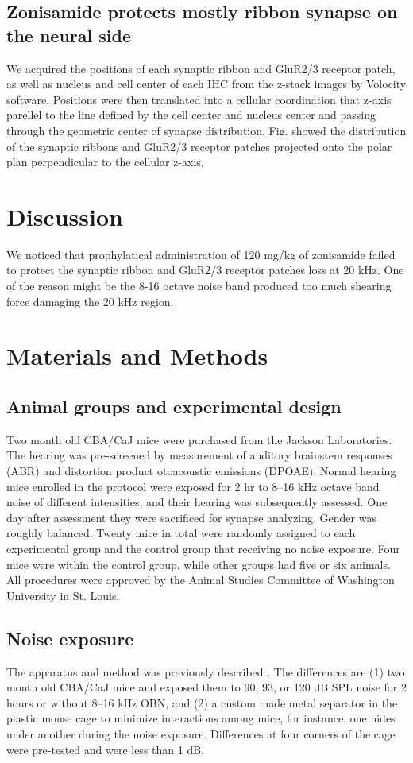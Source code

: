 \documentclass[11pt]{article}
\begin{document}
\subsection {Zonisamide protects mostly ribbon synapse on the neural side}

We acquired the positions of each synaptic ribbon and GluR2/3 receptor patch, as well as nucleus and cell center of each IHC from the z-stack images by Volocity software. Positions were then translated into a cellular coordination that z-axis parellel to the line defined by the cell center and nucleus center and passing through the geometric center of synapse distribution. Fig. showed the distribution of the synaptic ribbons and GluR2/3 receptor patches projected onto the polar plan perpendicular to the cellular z-axis. 

\section {Discussion}
We noticed that prophylatical administration of 120 mg/kg of zonisamide failed to protect the synaptic ribbon and GluR2/3 receptor patches loss at 20 kHz. One of the reason might be the 8-16 octave noise band produced too much shearing force damaging the 20 kHz region. 
\section{Materials and Methods}

\subsection {Animal groups and experimental design}
Two month old CBA/CaJ mice were purchased from the Jackson Laboratories. The hearing was pre-screened by measurement of auditory brainstem responses (ABR) and distortion product otoacoustic emissions (DPOAE). Normal hearing mice enrolled in the protocol were exposed for 2 hr to 8--16 kHz octave band noise of different intensities, and their hearing was subsequently assessed. One day after assessment they were sacrificed for synapse analyzing. Gender was roughly balanced. Twenty mice in total were randomly assigned to each experimental group and the control group that receiving no noise exposure. Four mice were within the control group, while other groups had five or six animals. All procedures were approved by the Animal Studies Committee of Washington University in St. Louis.

\subsection {Noise exposure}
The apparatus and method was previously described \cite{Ohlemiller2011}. The differences are (1) two month old CBA/CaJ mice and exposed them to 90, 93, or 120 dB SPL noise for 2 hours or without 8--16 kHz OBN, and (2) a custom made metal separator in the plastic mouse cage to minimize interactions among mice, for instance, one hides under another during the noise exposure. Differences at four corners of the cage were pre-tested and were less than 1 dB.
\end{document}
